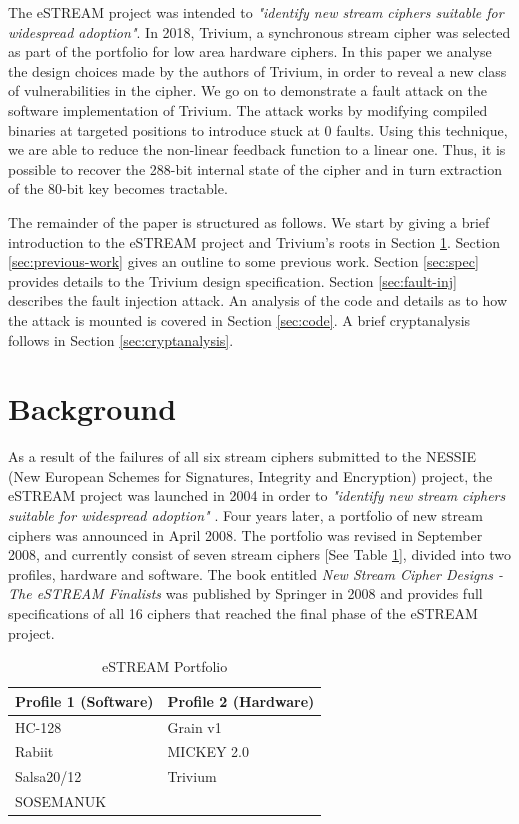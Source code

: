 \documentclass[conference]{IEEEtran}
\begin{document}
The eSTREAM project was intended to \textit{"identify new stream ciphers suitable for widespread adoption"}.\cite{call} In 2018, Trivium, a synchronous stream cipher was selected as part of the portfolio for low area hardware ciphers. In this paper we analyse the design choices made by the authors of Trivium, in order to reveal a new class of vulnerabilities in the cipher. We go on to demonstrate a fault attack on the software implementation of Trivium. The attack works by modifying compiled binaries at targeted positions to introduce stuck at 0 faults. Using this technique, we are able to reduce the non-linear feedback function to a linear one. Thus, it is possible to recover the 288-bit internal state of the cipher and in turn extraction of the 80-bit key becomes tractable.

The remainder of the paper is structured as follows. We start by giving a brief introduction to the eSTREAM project and Trivium's roots in Section \ref{sec:background}. Section \ref{sec:previous-work} gives an outline to some previous work. Section \ref{sec:spec} provides details to the Trivium design specification. Section \ref{sec:fault-inj} describes the fault injection attack. An analysis of the code and details as to how the attack is mounted is covered in Section \ref{sec:code}. A brief cryptanalysis follows in Section \ref{sec:cryptanalysis}.

\section{Background}\label{sec:background}

As a result of the failures of all six stream ciphers submitted to the NESSIE (New European Schemes for Signatures, Integrity and Encryption) project, the eSTREAM project was launched in 2004 in order to \textit{"identify new stream ciphers suitable for widespread adoption"} \cite{call}. Four years later, a portfolio of new stream ciphers was announced in April 2008. The portfolio was revised in September 2008, and currently consist of seven stream ciphers [See Table \ref{tab:portfolio}], divided into two profiles, hardware and software. The book entitled \textit{New Stream Cipher Designs - The eSTREAM Finalists} \cite{book} was published by Springer in 2008 and provides full specifications of all 16 ciphers that reached the final phase of the eSTREAM project.
\begin{table}[H]
\centering
\begin{tabular}{|l|l|}\hline
Profile 1 (Software) & Profile 2 (Hardware)\\\hline
HC-128 & Grain v1\\
Rabiit & MICKEY 2.0\\
Salsa20/12 & Trivium\\
SOSEMANUK & \\\hline
\end{tabular}
\caption{eSTREAM Portfolio}
\label{tab:portfolio}
\end{table}
\end{document}
